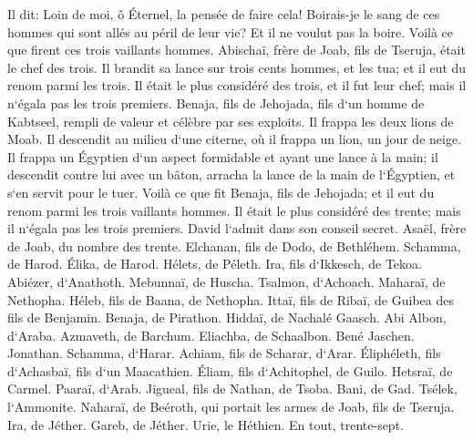 \verse Il dit: Loin de moi, ô Éternel, la pensée de faire cela! Boirais-je le sang de ces hommes qui sont allés au péril de leur vie? Et il ne voulut pas la boire. Voilà ce que firent ces trois vaillants hommes. 
\verse Abischaï, frère de Joab, fils de Tseruja, était le chef des trois. Il brandit sa lance sur trois cents hommes, et les tua; et il eut du renom parmi les trois. 
\verse Il était le plus considéré des trois, et il fut leur chef; mais il n`égala pas les trois premiers. 
\verse Benaja, fils de Jehojada, fils d`un homme de Kabtseel, rempli de valeur et célèbre par ses exploits. Il frappa les deux lions de Moab. Il descendit au milieu d`une citerne, où il frappa un lion, un jour de neige. 
\verse Il frappa un Égyptien d`un aspect formidable et ayant une lance à la main; il descendit contre lui avec un bâton, arracha la lance de la main de l`Égyptien, et s`en servit pour le tuer. 
\verse Voilà ce que fit Benaja, fils de Jehojada; et il eut du renom parmi les trois vaillants hommes. 
\verse Il était le plus considéré des trente; mais il n`égala pas les trois premiers. David l`admit dans son conseil secret. 
\verse Asaël, frère de Joab, du nombre des trente. Elchanan, fils de Dodo, de Bethléhem. 
\verse Schamma, de Harod. Élika, de Harod. 
\verse Hélets, de Péleth. Ira, fils d`Ikkesch, de Tekoa. 
\verse Abiézer, d`Anathoth. Mebunnaï, de Huscha. 
\verse Tsalmon, d`Achoach. Maharaï, de Nethopha. 
\verse Héleb, fils de Baana, de Nethopha. Ittaï, fils de Ribaï, de Guibea des fils de Benjamin. 
\verse Benaja, de Pirathon. Hiddaï, de Nachalé Gaasch. 
\verse Abi Albon, d`Araba. Azmaveth, de Barchum. 
\verse Eliachba, de Schaalbon. Bené Jaschen. Jonathan. 
\verse Schamma, d`Harar. Achiam, fils de Scharar, d`Arar. 
\verse Éliphéleth, fils d`Achasbaï, fils d`un Maacathien. Éliam, fils d`Achitophel, de Guilo. 
\verse Hetsraï, de Carmel. Paaraï, d`Arab. 
\verse Jigueal, fils de Nathan, de Tsoba. Bani, de Gad. 
\verse Tsélek, l`Ammonite. Naharaï, de Beéroth, qui portait les armes de Joab, fils de Tseruja. 
\verse Ira, de Jéther. Gareb, de Jéther. 
\verse Urie, le Héthien. En tout, trente-sept. 

\chapter{}

